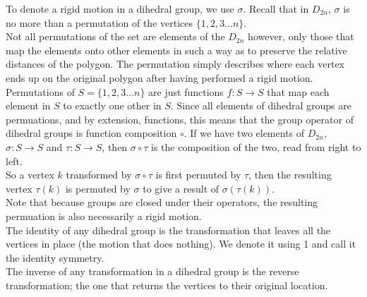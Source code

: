 \documentclass[12pt]{article}
\begin{document}
    To denote a rigid motion in a dihedral group,
    we use $\sigma$.
    Recall that in $D_{2n}$,
    $\sigma$ is no more than a permutation
    of the vertices $\{1, 2, 3 \dots n\}$. \\
    Not all permutations of the set are elements of the $D_{2n}$ however,
    only those that map the elements onto other elements in such a way
    as to preserve the relative distances of the polygon.
    The permutation simply describes where each vertex ends up on the
    original polygon after having performed a rigid motion. \\

    Permutations of $S = \{1, 2, 3 \dots n\}$ are just functions
    $f: S \rightarrow S$ that map each element in $S$ to exactly
    one other in $S$.
    Since all elements of dihedral groups are permuations,
    and by extension, functions,
    this means that the group operator of dihedral groups
    is function composition $\circ$.
    If we have two elements of $D_{2n}$, $\sigma: S \rightarrow S$
    and $\tau: S \rightarrow S$,
    then $\sigma \circ \tau$
    is the composition of the two, read from right to left. \\
    So a vertex $k$ transformed by $\sigma \circ \tau$
    is first permuted by $\tau$,
    then the resulting vertex $\tau(k)$ is permuted by $\sigma$
    to give a result of $\sigma(\tau(k))$. \\
    Note that because groups are closed under their operators,
    the resulting permuation is also necessarily a rigid motion. \\

    The identity of any dihedral group is the transformation
    that leaves all the vertices in place (the motion that does nothing).
    We denote it using 1 and call it the identity symmetry. \\

    The inverse of any transformation in a dihedral group
    is the reverse transformation;
    the one that returns the vertices to their original location. \\
\end{document}
